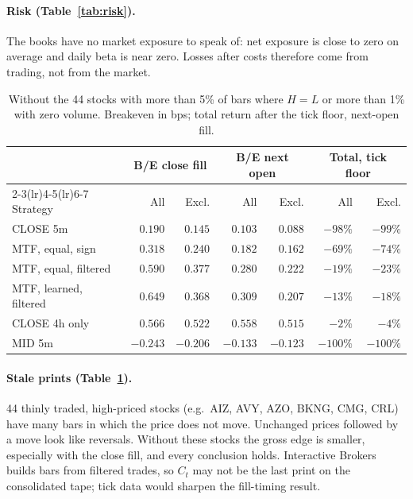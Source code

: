 \documentclass[11pt,a4paper]{article}
\begin{document}
\paragraph{Risk (Table~\ref{tab:risk}).} The books have no market exposure to speak of: net exposure is
close to zero on average and daily beta is near zero. Losses after costs therefore come from trading, not
from the market.

\begin{table}[htbp]
\centering
\caption{Without the 44 stocks with more than 5\% of bars where $H=L$ or more than 1\% with zero volume.
Breakeven in bps; total return after the tick floor, next-open fill.}
\label{tab:robust}
\footnotesize
\setlength{\tabcolsep}{3pt}
\begin{tabular}{@{}lrrrrrr@{}}
\toprule
& \multicolumn{2}{c}{B/E close fill} & \multicolumn{2}{c}{B/E next open} & \multicolumn{2}{c}{Total, tick floor} \\
\cmidrule(lr){2-3}\cmidrule(lr){4-5}\cmidrule(lr){6-7}
Strategy & All & Excl. & All & Excl. & All & Excl. \\
\midrule
CLOSE 5m & $0.190$ & $0.145$ & $0.103$ & $0.088$ & $-98\%$ & $-99\%$ \\
MTF, equal, sign & $0.318$ & $0.240$ & $0.182$ & $0.162$ & $-69\%$ & $-74\%$ \\
MTF, equal, filtered & $0.590$ & $0.377$ & $0.280$ & $0.222$ & $-19\%$ & $-23\%$ \\
MTF, learned, filtered & $0.649$ & $0.368$ & $0.309$ & $0.207$ & $-13\%$ & $-18\%$ \\
CLOSE 4h only & $0.566$ & $0.522$ & $0.558$ & $0.515$ & $-2\%$ & $-4\%$ \\
MID 5m & $-0.243$ & $-0.206$ & $-0.133$ & $-0.123$ & $-100\%$ & $-100\%$ \\
\bottomrule
\end{tabular}
\end{table}

\paragraph{Stale prints (Table~\ref{tab:robust}).} 44 thinly traded, high-priced stocks (e.g.\
AIZ, AVY, AZO, BKNG, CMG, CRL) have many bars in which the price does not move. Unchanged prices followed by a move look
like reversals. Without these stocks the gross edge is smaller, especially with the close fill, and every
conclusion holds. Interactive Brokers builds bars from filtered trades, so $C_t$ may not be the last print
on the consolidated tape; tick data would sharpen the fill-timing result.
\end{document}
